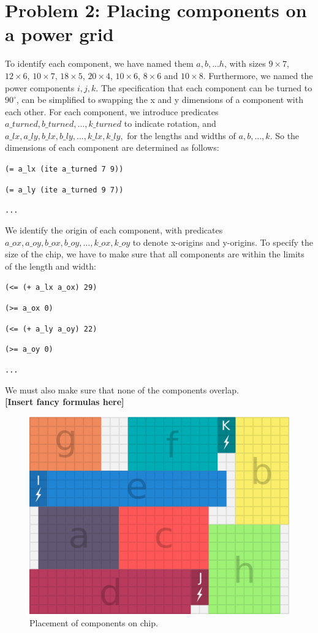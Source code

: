 \documentclass[a4paper]{article}
\begin{document}
	\section*{Problem 2: Placing components on a power grid}
	To identify each component, we have named them $a, b, ... h$, with sizes $9 \times 7$, $12 \times 6$, $10 \times 7$, $18 \times 5$, $20 \times 4$, $10 \times 6$, $8 \times 6$ and $10 \times 8$. Furthermore, we named the power components $i, j, k$. 
	The specification that each component can be turned to $90^{\circ}$, can be simplified to swapping the x and y dimensions of a component with each other. For each component, we introduce predicates $a\_turned, b\_turned, ..., k\_turned$ to indicate rotation, and $a\_lx, a\_ly, b\_lx, b\_ly, ..., k\_lx, k\_ly,$ for the lengths and widths of $a, b, ..., k$. So the dimensions of each component are determined as follows:

	{\tt (= a\_lx (ite a\_turned 7 9))}
	
	{\tt (= a\_ly (ite a\_turned 9 7))}
	
	{\tt ...}
	
	\noindent We identify the origin of each component, with predicates $a\_ox, a\_oy, b\_ox, b\_oy, ..., k\_ox, k\_oy$ to denote x-origins and y-origins. To specify the size of the chip, we have to make sure that all components are within the limits of the length and width:
	
	{\tt (<= (+ a\_lx a\_ox) 29)}
	
	{\tt (>= a\_ox 0)}
	
	{\tt (<= (+ a\_ly a\_oy) 22)}
	
	{\tt (>= a\_oy 0)}
	
	{\tt ...}
	
	\noindent We must also make sure that none of the components overlap.\\
	\textbf{[Insert fancy formulas here]}
	
	\begin{figure}[H]
		\centering
			\includegraphics[scale=0.7]{power-grid-3.png}
		\caption{Placement of components on chip.}
	\end{figure}
\end{document}
